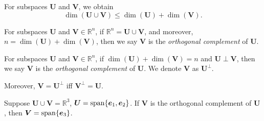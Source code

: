 \begin{corollary}
For subspaces $\bm U$ and $\bm V$, we obtain
\[
\dim(\bm U\cup\bm V)\le \dim(\bm U) + \dim(\bm V).
\]
\end{corollary}
For subspaces $\bm U$ and $\bm V\in\mathbb{R}^{n}$, if $\mathbb{R}^{n}=\bm U\cup\bm V$, and moreover, $n=\dim(\bm U)+\dim(\bm V)$, then we say $\bm V$ is the \emph{orthogonal complement} of $\bm U$.
\begin{definition}
For subspaces $\bm U$ and $\bm V\in\mathbb{R}^{n}$, if $\dim(\bm U)+\dim(\bm V)=n$ and $\bm U\perp\bm V$, then we say $\bm V$ is the \emph{orthogonal complement} of $\bm U$. We denote $\bm V$ as $\bm U^{\perp}$.

Moreover, $\bm V=\bm U^{\perp}$ iff $\bm V^{\perp}=\bm U$.
\end{definition}
\begin{example}
Suppose $\bm U\cup\bm V=\mathbb{R}^{3}$, $\bm U=\operatorname{span}\{\bm e_1,\bm e_2\}$. If $\bm V$ is the orthogonal complement of $\bm U$, then $\bm V=\operatorname{span}\{\bm e_3\}$.
\end{example}

